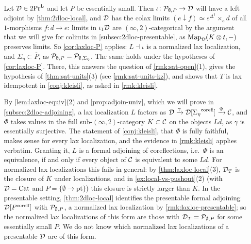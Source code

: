 \begin{rmk}
\label{rmk:laxloc-presentable}
%
Let $\mathcal{D} \in \operatorname{2Pr}^{\operatorname{L}}$ and let $P$ be essentially small. Then
$\iota\colon \mathcal{P}_{\emptyset,P} \to \mathcal{D}$
will have a left adjoint by \cref{thm:2dloc-local}, and $\mathcal{D}$ has the colax
limits
$(e \downarrow f) \simeq e^{\Delta^{1}} \times_{e} d$
of all $1$-morphisms $f\colon d \to e$: limits in $\iota_{1}\mathcal{D}$ are
$(\infty,2)$-categorical by the argument that we will give for colimits in
\cref{subsec:2dloc-presentable}, as
$\operatorname{Map}_{\mathcal{D}}(K \otimes t,-)$
preserves limits. So \cref{cor:laxloc-P} applies:
$L \dashv \iota$
is a normalized lax localization, and
$\Sigma_{\eta} \subset \overline{P}$,
as
$\mathcal{P}_{\emptyset,P} = \mathcal{P}_{\emptyset,\Sigma_{\eta}}$.
The same holds under the hypotheses of \cref{cor:laxloc-P}. There, this answers
the question of \cref{rmk:sat-open}(1), gives the hypothesis of
\cref{thm:sat-units}(3) (see \cref{rmk:sat-units-kz}), and shows that $T$ is
lax idempotent in \cref{conj:kleisli}, as asked in \cref{rmk:kleisli}.
\end{rmk}

\begin{rmk}
\label{rmk:laxloc-adjoining}
%
By \cref{lem:laxloc-equiv}(2) and \cref{prop:adjoin-univ},
which we will prove in
\cref{subsec:2dloc-adjoining}, a lax localization $L$ factors as
$\mathcal{D} \xrightarrow{\gamma} \mathcal{D}[{\Sigma_{\eta}}^{\mathrm{corefl}}] \xrightarrow{\Phi} \mathcal{C}$,
and $\Phi$ takes values in the full sub-$(\infty,2)$-category
$K \subset \mathcal{C}$
on the objects $Ld$, as $\gamma$ is essentially surjective. The statement of
\cref{conj:kleisli}, that $\Phi$ is fully faithful, makes sense for every lax
localization, and the evidence in \cref{rmk:kleisli} applies verbatim. Granting
it, $L$ is a formal adjoining of coreflections, i.e.\ $\Phi$ is an equivalence,
if and only if every object of $\mathcal{C}$ is equivalent to some $Ld$. For normalized
lax localizations this fails in general: by \cref{thm:laxloc-local}(3),
$\mathcal{D}_{T}$ is the closure of $K$ under localizations, and in
\cref{ex:local-vs-pushout}(2) (with $\mathcal{D} = \mathrm{Cat}$ and
$P = \{\emptyset \to \mathrm{pt}\}$)
this closure is strictly larger than $K$. In the presentable setting,
\cref{thm:2dloc-local} identifies the presentable formal adjoining
$\mathcal{D}[{P}^{\mathrm{corefl}}]$ with $\mathcal{P}_{\emptyset,P}$, a normalized lax localization by
\cref{rmk:laxloc-presentable}; so the normalized lax localizations of this form
are those with
$\mathcal{D}_{T} = \mathcal{P}_{\emptyset,P}$
for some essentially small $P$. We do not know which normalized lax
localizations of a presentable $\mathcal{D}$ are of this form.
\end{rmk}
